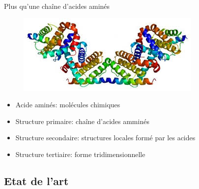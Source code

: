 \documentclass{beamer}
\begin{document}
\begin{frame}{Plus qu'une chaîne d'acides aminés}
  \begin{figure}
    \centering
    \includegraphics[scale=0.3]{../Figures/prot}
  \end{figure}
    \begin{itemize}
    \item Acide aminés: molécules chimiques\pause
    \item Structure primaire: chaîne d'acides amminés\pause
    \item Structure secondaire: structures locales formé par les acides\pause
    \item Structure tertiaire: forme tridimensionnelle \pause
    \end{itemize}
\end{frame}

\subsection{Etat de l'art}
\end{document}

